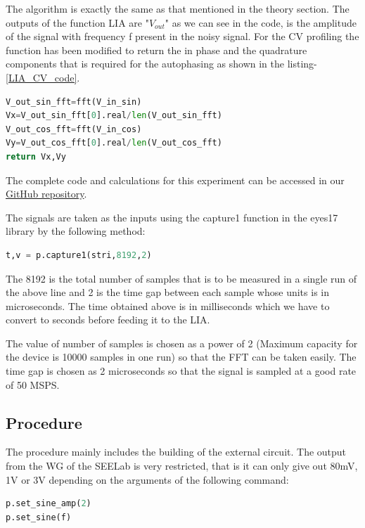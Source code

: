 \documentclass{article}
\begin{document}
\begin{multicols}{2}
The algorithm is exactly the same as that mentioned in the theory section. The outputs of the function LIA are "$V_{out}$" as we can see in the code, is the amplitude of the signal with frequency f present in the noisy signal. For the CV profiling the function has been modified to return the in phase and the quadrature components that is required for the autophasing as shown in the listing-\ref{LIA_CV_code}.

\begin{lstlisting}[language=Python, caption=Modified function for CV-Profiling,label=LIA_CV_code]
V_out_sin_fft=fft(V_in_sin)
Vx=V_out_sin_fft[0].real/len(V_out_sin_fft)
V_out_cos_fft=fft(V_in_cos)
Vy=V_out_cos_fft[0].real/len(V_out_cos_fft)
return Vx,Vy
\end{lstlisting}


The complete code and calculations for this experiment can be accessed in our \href{https://github.com/ananthapadmanabhan18/Lock_in_Amplifier_with_ExpEyes.git}{GitHub repository}.

The signals are taken as the inputs using the capture1 function in the eyes17 library by the following method:

\begin{lstlisting}[language=Python]
t,v = p.capture1(stri,8192,2)
\end{lstlisting}
The 8192 is the total number of samples that is to be measured in a single run of the above line and 2 is the time gap between each sample whose units is in microseconds. The time obtained above is in milliseconds which we have to convert to seconds before feeding it to the LIA.

The value of number of samples is chosen as a power of 2 (Maximum capacity for the device is 10000 samples in one run) so that the FFT can be taken easily. The time gap is chosen as 2 microseconds so that the signal is sampled at a good rate of 50 MSPS.

\subsection{Procedure}

The procedure mainly includes the building of the external circuit. The output from the WG of the SEELab is very restricted, that is it can only give out 80mV, 1V or 3V depending on the arguments of the following command:
\begin{lstlisting}[language=Python]
p.set_sine_amp(2)
p.set_sine(f)    
\end{lstlisting}


\end{multicols}
\end{document}
